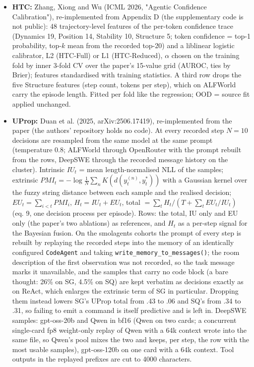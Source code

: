 \documentclass[10pt,a4paper]{article}
\begin{document}
\begin{itemize}
\item \textbf{HTC:} Zhang, Xiong and Wu (ICML 2026, "Agentic Confidence Calibration"), re-implemented from Appendix D (the supplementary code is not public): 48 trajectory-level features of the per-token confidence trace (Dynamics 19, Position 14, Stability 10, Structure 5; token confidence = top-1 probability, top-\ensuremath{k} mean from the recorded top-20) and a liblinear logistic calibrator, L2 (HTC-Full) or L1 (HTC-Reduced), \ensuremath{\alpha} chosen on the training fold by inner 3-fold CV over the paper's 15-value grid (AUROC, ties by Brier); features standardised with training statistics. A third row drops the five Structure features (step count, tokens per step), which on ALFWorld carry the episode length. Fitted per fold like the regression; OOD = source fit applied unchanged.
\item \textbf{UProp:} Duan et al. (2025, arXiv:2506.17419), re-implemented from the paper (the authors' repository holds no code). At every recorded step \ensuremath{N=10} decisions are resampled from the same model at the same prompt (temperature 0.8; ALFWorld through OpenRouter with the prompt rebuilt from the rows, DeepSWE through the recorded message history on the cluster). Intrinsic \ensuremath{IU_t} = mean length-normalised NLL of the samples; extrinsic \ensuremath{PMI_t = -\log \tfrac{1}{N}\sum_n K(d(y_t^{(n)}, y_t^*))} with a Gaussian kernel over the fuzzy string distance between each sample and the realised decision; \ensuremath{EU_t = \sum_{i<t} PMI_i}, \ensuremath{H_t = IU_t + EU_t}, total \ensuremath{= \sum_t H_t / (T + \sum_t EU_t / IU_t)} (eq. 9, one decision process per episode). Rows: the total, IU only and EU only (the paper's two ablations) as references, and \ensuremath{H_t} as a per-step signal for the Bayesian fusion. On the smolagents cohorts the prompt of every step is rebuilt by replaying the recorded steps into the memory of an identically configured \texttt{CodeAgent} and taking \texttt{write\_memory\_to\_messages()}; the room description of the first observation was not recorded, so the task message marks it unavailable, and the samples that carry no code block (a bare thought: 26\% on SG, 4.5\% on SQ) are kept verbatim as decisions exactly as on ReAct, which enlarges the extrinsic term of SG in particular. Dropping them instead lowers SG's UProp total from .43 to .06 and SQ's from .34 to .31, so failing to emit a command is itself predictive and is left in. DeepSWE samples: gpt-oss-20b and Qwen in bf16 (Qwen on two cards; a concurrent single-card fp8 weight-only replay of Qwen with a 64k context wrote into the same file, so Qwen's pool mixes the two and keeps, per step, the row with the most usable samples), gpt-oss-120b on one card with a 64k context. Tool outputs in the replayed prefixes are cut to 4000 characters.

\end{itemize}
\end{document}
